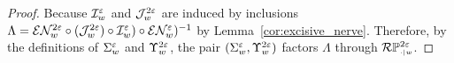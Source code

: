 \begin{proof}
  Because $\I_w^\e$ and $\J_w^{2\e}$ are induced by inclusions $\Lambda = \E\N_w^{2\e}\circ (\J_w^{2\e})\circ \I_w^\e)\circ \E\N_w^\e)^{-1}$ by Lemma~\ref{cor:excisive_nerve}.
  Therefore, by the definitions of $\Sigma_w^\e$ and $\Upsilon_w^{2\e}$, the pair $(\Sigma_w^\e, \Upsilon_w^{2\e})$ factors $\Lambda$ through $\RPP{w}{2\e}$.
\end{proof}




